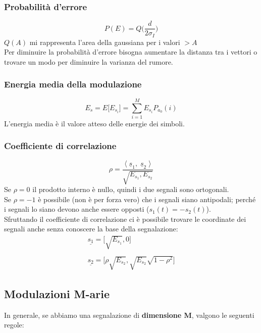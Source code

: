 \documentclass{article}
\begin{document}
\subsubsection{Probabilità d'errore}
$$P(E)=Q\biggl(\frac{d}{2\sigma_I}\biggl)$$
$Q(A)$ mi rappresenta l'area della gaussiana per i valori $>A$\\
Per diminuire la probabilità d'errore bisogna aumentare la distanza tra i vettori o trovare un modo per diminuire la varianza del rumore.

\subsubsection{Energia media della modulazione}
$$E_s=E\biggl[E_{s_i}\biggl]=\sum_{i=1}^ME_{s_i}P_{a_0}(i)$$
L'energia media è il valore atteso delle energie dei simboli.\\

\subsubsection{Coefficiente di correlazione}
$$\rho=\frac{\langle\;\underline{s}_1,\;\underline{s}_2\;\rangle}{\sqrt{E_{s_1},E_{s_2}}}$$
Se $\rho=0$ il prodotto interno è nullo, quindi i due segnali sono ortogonali.\\
Se $\rho=-1$ è possibile (non è per forza vero) che i segnali siano antipodali; perché i segnali lo siano devono anche essere opposti ($s_1(t)=-s_2(t)$).\\
Sfruttando il coefficiente di correlazione ci è possibile trovare le coordinate dei segnali anche senza conoscere la base della segnalazione:
$$\begin{array}{c}
	\underline{s_1}=\biggl[\sqrt{E_{s_1}},0\biggl]\\\\
	\underline{s_2}=\biggl[\rho\sqrt{E_{s_2}},\sqrt{E_{s_2}}\sqrt{1-\rho^2}\biggl]
\end{array}$$

\subsection{Modulazioni M-arie}
In generale, se abbiamo una segnalazione di \textbf{dimensione M}, valgono le seguenti regole:
\end{document}

